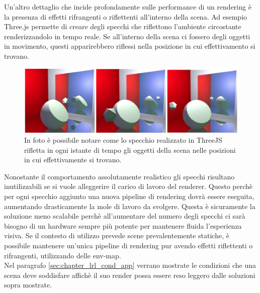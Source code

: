 Un’altro dettaglio che incide profondamente sulle performance di un rendering è la presenza di effetti rifrangenti o riflettenti all’interno della scena. Ad esempio Three.js permette di creare degli specchi che riflettono l’ambiente circostante renderizzandolo in tempo reale.
Se all’interno della scena ci fossero degli oggetti in movimento, questi apparirebbero riflessi nella posizione in cui effettivamento si trovano.
\\
\begin{figure}[htb]
 \centering
 \includegraphics[width=0.8\linewidth]{images/chapter_lrl/lrl_specchio.png}\hfill
 \caption[ThreeJS Mirror]{In foto è possibile notare come lo specchio realizzato in ThreeJS rifletta in ogni istante di tempo gli oggetti della scena nelle posizioni in cui effettivamente si trovano.}
 \label{fig:lrl_specchio}
\end{figure}
Nonostante il comportamento assolutamente realistico gli specchi risultano inutilizzabili se si vuole  alleggerire il carico di lavoro del renderer. Questo perchè per ogni specchio aggiunto una nuova pipeline di rendering dovrà essere eseguita, aumentando drasticamente la mole di lavoro da svolgere. Questa è sicuramente la soluzione meno scalabile perchè all’aumentare del numero degli specchi ci sarà bisogno di un hardware sempre più potente per mantenere fluida l’esperienza visiva. Se il contesto di utilizzo prevede scene prevalentemente statiche, è possibile  mantenere un’unica pipeline di rendering pur avendo effetti riflettenti o rifrangenti, utilizzando delle env-map. 
\\
Nel paragrafo \ref{sec:chapter_lrl_cond_app} verrano mostrate le condizioni che una scena deve soddisfare affichè il suo render possa essere reso leggero dalle soluzioni sopra mostrate.
